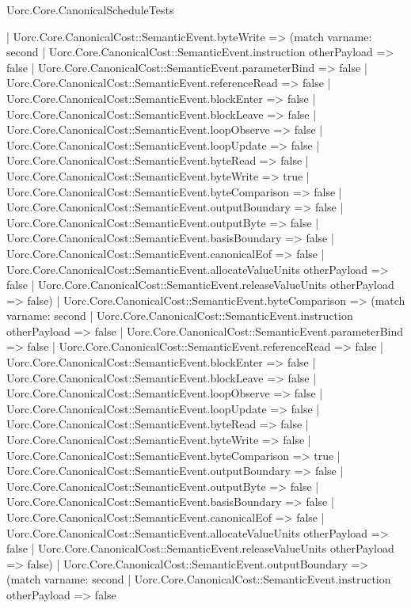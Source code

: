 \begin{lexlean}{Uorc.Core.CanonicalScheduleTests}
\begin{semanticmodule}
{    | Uorc.Core.CanonicalCost::SemanticEvent.byteWrite => (match var{name: second}
      | Uorc.Core.CanonicalCost::SemanticEvent.instruction otherPayload => false
      | Uorc.Core.CanonicalCost::SemanticEvent.parameterBind => false
      | Uorc.Core.CanonicalCost::SemanticEvent.referenceRead => false
      | Uorc.Core.CanonicalCost::SemanticEvent.blockEnter => false
      | Uorc.Core.CanonicalCost::SemanticEvent.blockLeave => false
      | Uorc.Core.CanonicalCost::SemanticEvent.loopObserve => false
      | Uorc.Core.CanonicalCost::SemanticEvent.loopUpdate => false
      | Uorc.Core.CanonicalCost::SemanticEvent.byteRead => false
      | Uorc.Core.CanonicalCost::SemanticEvent.byteWrite => true
      | Uorc.Core.CanonicalCost::SemanticEvent.byteComparison => false
      | Uorc.Core.CanonicalCost::SemanticEvent.outputBoundary => false
      | Uorc.Core.CanonicalCost::SemanticEvent.outputByte => false
      | Uorc.Core.CanonicalCost::SemanticEvent.basisBoundary => false
      | Uorc.Core.CanonicalCost::SemanticEvent.canonicalEof => false
      | Uorc.Core.CanonicalCost::SemanticEvent.allocateValueUnits otherPayload => false
      | Uorc.Core.CanonicalCost::SemanticEvent.releaseValueUnits otherPayload => false)
    | Uorc.Core.CanonicalCost::SemanticEvent.byteComparison => (match var{name: second}
      | Uorc.Core.CanonicalCost::SemanticEvent.instruction otherPayload => false
      | Uorc.Core.CanonicalCost::SemanticEvent.parameterBind => false
      | Uorc.Core.CanonicalCost::SemanticEvent.referenceRead => false
      | Uorc.Core.CanonicalCost::SemanticEvent.blockEnter => false
      | Uorc.Core.CanonicalCost::SemanticEvent.blockLeave => false
      | Uorc.Core.CanonicalCost::SemanticEvent.loopObserve => false
      | Uorc.Core.CanonicalCost::SemanticEvent.loopUpdate => false
      | Uorc.Core.CanonicalCost::SemanticEvent.byteRead => false
      | Uorc.Core.CanonicalCost::SemanticEvent.byteWrite => false
      | Uorc.Core.CanonicalCost::SemanticEvent.byteComparison => true
      | Uorc.Core.CanonicalCost::SemanticEvent.outputBoundary => false
      | Uorc.Core.CanonicalCost::SemanticEvent.outputByte => false
      | Uorc.Core.CanonicalCost::SemanticEvent.basisBoundary => false
      | Uorc.Core.CanonicalCost::SemanticEvent.canonicalEof => false
      | Uorc.Core.CanonicalCost::SemanticEvent.allocateValueUnits otherPayload => false
      | Uorc.Core.CanonicalCost::SemanticEvent.releaseValueUnits otherPayload => false)
    | Uorc.Core.CanonicalCost::SemanticEvent.outputBoundary => (match var{name: second}
      | Uorc.Core.CanonicalCost::SemanticEvent.instruction otherPayload => false
}
\end{semanticmodule}
\end{lexlean}
